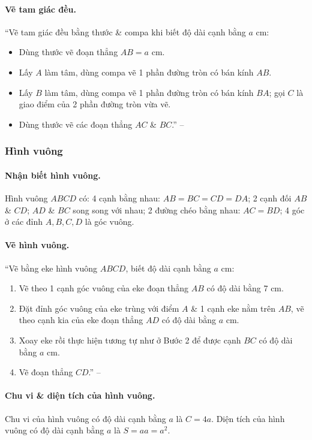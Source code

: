 \documentclass{article}
\numberwithin{equation}{section}
\begin{document}
\paragraph{Vẽ tam giác đều.} ``Vẽ tam giác đều bằng thước \& compa khi biết độ dài cạnh bằng $a$ cm:
\begin{itemize}
	\item Dùng thước vẽ đoạn thẳng $AB = a$ cm.
	\item Lấy $A$ làm tâm, dùng compa vẽ 1 phần đường tròn có bán kính $AB$.
	\item Lấy $B$ làm tâm, dùng compa vẽ 1 phần đường tròn có bán kính $BA$; gọi $C$ là giao điểm của 2 phần đường tròn vừa vẽ.
	\item Dùng thước vẽ các đoạn thẳng $AC$ \& $BC$.'' -- \cite[p. 94]{Thai_Anh_Dat_Ha_Loan_Nam_Quang_Toan_6_tap_1}
\end{itemize}

\subsubsection{Hình vuông}

\paragraph{Nhận biết hình vuông.} Hình vuông $ABCD$ có: 4 cạnh bằng nhau: $AB = BC = CD = DA$; 2 cạnh đối $AB$ \& $CD$; $AD$ \& $BC$ song song với nhau; 2 đường chéo bằng nhau: $AC = BD$; 4 góc ở các đỉnh $A,B,C,D$ là góc vuông.

\paragraph{Vẽ hình vuông.} ``Vẽ bằng eke hình vuông $ABCD$, biết độ dài cạnh bằng $a$ cm:
\begin{enumerate}
	\item Vẽ theo 1 cạnh góc vuông của eke đoạn thẳng $AB$ có độ dài bằng 7 cm.
	\item Đặt đỉnh góc vuông của eke trùng với điểm $A$ \& 1 cạnh eke nằm trên $AB$, vẽ theo cạnh kia của eke đoạn thẳng $AD$ có độ dài bằng $a$ cm.
	\item Xoay eke rồi thực hiện tương tự như ở Bước 2 để được cạnh $BC$ có độ dài bằng $a$ cm.
	\item Vẽ đoạn thẳng $CD$.'' -- \cite[p. 95]{Thai_Anh_Dat_Ha_Loan_Nam_Quang_Toan_6_tap_1}
\end{enumerate}

\paragraph{Chu vi \& diện tích của hình vuông.} Chu vi của hình vuông có độ dài cạnh bằng $a$ là $C = 4a$. Diện tích của hình vuông có độ dài cạnh bằng $a$ là $S = aa = a^2$.
\end{document}
